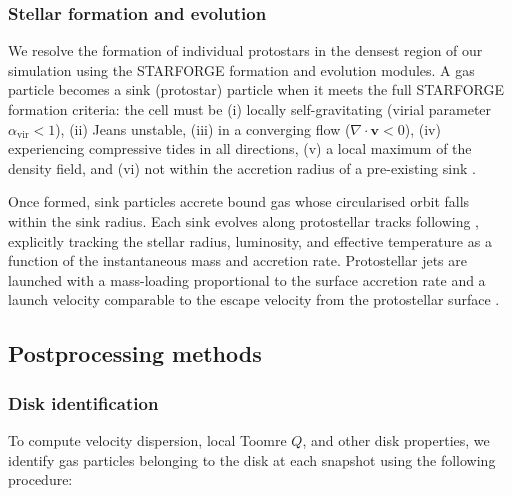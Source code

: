 \documentclass[twocolumn]{openjournal}
\begin{document}
\subsubsection{Stellar formation and evolution}
\label{sec:stars}

We resolve the formation of individual protostars in the densest region
of our simulation using the STARFORGE \citep{STARFORGE_Towa_Grudic_2021}
formation and evolution modules.
A gas particle becomes a sink (protostar) particle when
it meets the full STARFORGE formation criteria: the cell must be
(i) locally self-gravitating (virial parameter $\alpha_\mathrm{vir} < 1$),
(ii) Jeans unstable,
(iii) in a converging flow ($\nabla \cdot \mathbf{v} < 0$),
(iv) experiencing compressive tides in all directions,
(v) a local maximum of the density field, and
(vi) not within the accretion radius of a pre-existing sink
\citep{STARFORGE_Towa_Grudic_2021}.

Once formed, sink particles accrete bound gas whose circularised orbit falls
within the sink radius.
Each sink evolves along protostellar tracks following \citet{Offner_2009},
explicitly tracking the stellar radius, luminosity, and effective temperature
as a function of the instantaneous mass and accretion rate.
Protostellar jets are launched with a mass-loading proportional to the
surface accretion rate and a launch velocity comparable to the escape
velocity from the protostellar surface \citep{STARFORGE_Towa_Grudic_2021}.


\subsection{Postprocessing methods}

\subsubsection{Disk identification}
\label{sec:diskid}

To compute velocity dispersion, local Toomre $Q$, and other disk
properties, we identify gas particles belonging to the disk at
each snapshot using the following procedure:
\end{document}
